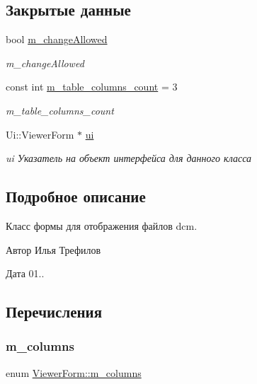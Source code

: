 \subsection*{Закрытые данные}
\begin{DoxyCompactItemize}
\item 
bool \hyperlink{classViewerForm_a38c70bda1c65ed5a26e06eb73233ffb2}{m\+\_\+change\+Allowed}
\begin{DoxyCompactList}\small\item\em m\+\_\+change\+Allowed \end{DoxyCompactList}\item 
const int \hyperlink{classViewerForm_aec8417758835f4b71657413c06eec160}{m\+\_\+table\+\_\+columns\+\_\+count} = 3
\begin{DoxyCompactList}\small\item\em m\+\_\+table\+\_\+columns\+\_\+count \end{DoxyCompactList}\item 
Ui\+::\+Viewer\+Form $\ast$ \hyperlink{classViewerForm_a0e264f78c6535b2442b03629ebdc0347}{ui}
\begin{DoxyCompactList}\small\item\em ui Указатель на объект интерфейса для данного класса \end{DoxyCompactList}\end{DoxyCompactItemize}


\subsection{Подробное описание}
Класс формы для отображения файлов dcm. 

\begin{DoxyAuthor}{Автор}
Илья Трефилов 
\end{DoxyAuthor}
\begin{DoxyDate}{Дата}
01.. 
\end{DoxyDate}


\subsection{Перечисления}
\mbox{\label{classViewerForm_adb304869a7f4e7573df0e018cd03a845}} 
\subsubsection{\texorpdfstring{m\+\_\+columns}{m\_columns}}
{\footnotesize\ttfamily enum \hyperlink{classViewerForm_adb304869a7f4e7573df0e018cd03a845}{Viewer\+Form\+::m\+\_\+columns}\hspace{0.3cm}{\ttfamily [private]}}



